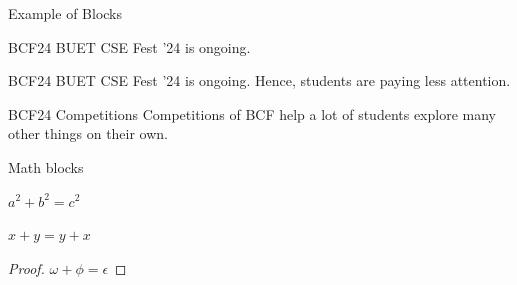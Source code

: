 \documentclass{beamer}
\begin{document}
\begin{frame}{Example of Blocks}

\begin{block}{BCF24}
    BUET CSE Fest '24 is ongoing. 
\end{block}

\begin{alertblock}{BCF24}
    BUET CSE Fest '24 is ongoing. Hence, students are paying less attention. 
\end{alertblock}

\begin{example}{BCF24 Competitions}
    Competitions of BCF help a lot of students explore many other things on their own.
\end{example}
    
\end{frame}

\begin{frame}{
    Math blocks
}
    \begin{theorem}[Pythagoras] 
    $ a^2 + b^2 = c^2$
    \end{theorem} \pause 
    \begin{corollary}
    $ x + y = y + x  $
    \end{corollary} \pause 
    \begin{proof}
    $\omega +\phi = \epsilon $
    \end{proof}    
\end{frame}
\end{document}
